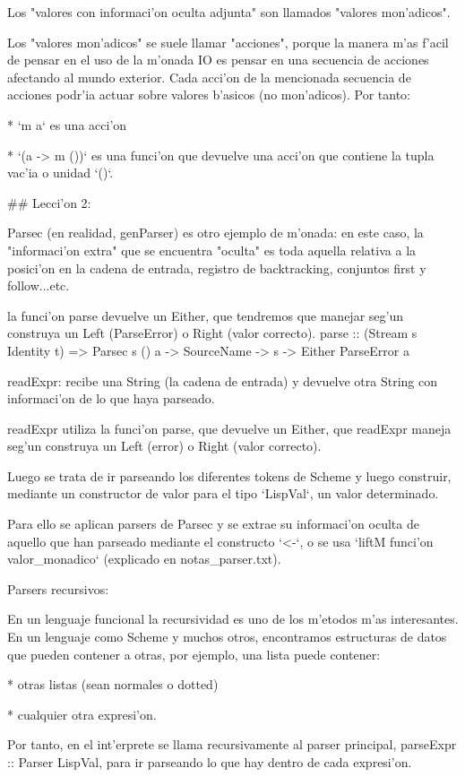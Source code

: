 Los "valores con informaci'on oculta adjunta" son llamados "valores mon'adicos". 

Los "valores mon'adicos" se suele llamar "acciones", porque la manera m'as f'acil de pensar en el uso de la m'onada IO es pensar en una secuencia de acciones afectando al mundo exterior. Cada acci'on de la mencionada secuencia de acciones podr'ia actuar sobre valores b'asicos (no mon'adicos). Por tanto:

* `m a` es una acci'on

* `(a -> m ())` es una funci'on que devuelve una acci'on que contiene la tupla vac'ia o unidad `()`. 

## Lecci'on 2:

Parsec (en realidad, genParser) es otro ejemplo de m'onada: en este caso, la "informaci'on extra" que se encuentra "oculta" es toda aquella relativa a la posici'on en la cadena de entrada, registro de backtracking, conjuntos first y follow...etc.

la funci'on parse devuelve un Either, que tendremos que manejar seg'un construya un Left (ParseError) o Right (valor correcto). parse :: (Stream s Identity t) => Parsec s () a -> SourceName -> s -> Either ParseError a

readExpr: recibe una String (la cadena de entrada) y devuelve otra String con informaci'on de lo que haya parseado.

readExpr utiliza la funci'on parse, que devuelve un Either, que readExpr maneja seg'un construya un Left (error) o Right (valor correcto).

Luego se trata de ir parseando los diferentes tokens de Scheme y luego construir, mediante un constructor de valor para el tipo `LispVal`, un valor determinado.

Para ello se aplican parsers de Parsec y se extrae su informaci'on oculta de aquello que han parseado mediante el constructo `<-`, o se usa `liftM funci'on valor\_monadico` (explicado en notas\_parser.txt).

Parsers recursivos:

En un lenguaje funcional la recursividad es uno de los m'etodos m'as interesantes. En un lenguaje como Scheme y muchos otros, encontramos estructuras de datos que pueden contener a otras, por ejemplo, una lista puede contener:

* otras listas (sean normales o dotted)

* cualquier otra expresi'on.

Por tanto, en el int'erprete se llama recursivamente al parser principal, parseExpr :: Parser LispVal, para ir parseando lo que hay dentro de cada expresi'on.

